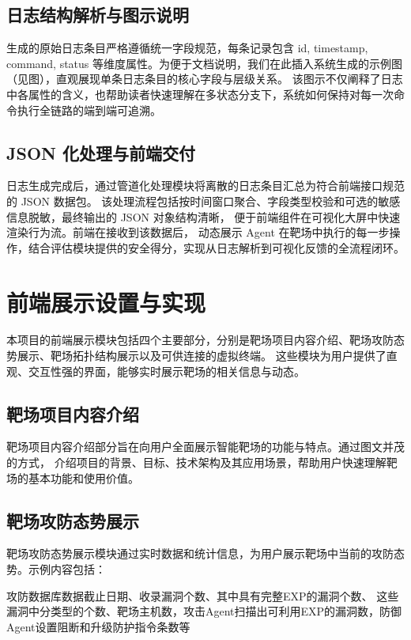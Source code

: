 \documentclass[lang=cn,10pt]{elegantbook}
\begin{document}
\subsection{日志结构解析与图示说明}
生成的原始日志条目严格遵循统一字段规范，每条记录包含 id, timestamp, command, status
等维度属性。为便于文档说明，我们在此插入系统生成的示例图（见图），直观展现单条日志条目的核心字段与层级关系。
该图示不仅阐释了日志中各属性的含义，也帮助读者快速理解在多状态分支下，系统如何保持对每一次命令执行全链路的端到端可追溯。

\subsection{JSON 化处理与前端交付}
日志生成完成后，通过管道化处理模块将离散的日志条目汇总为符合前端接口规范的 JSON 数据包。
该处理流程包括按时间窗口聚合、字段类型校验和可选的敏感信息脱敏，最终输出的 JSON 对象结构清晰，
便于前端组件在可视化大屏中快速渲染行为流。前端在接收到该数据后，
动态展示 Agent 在靶场中执行的每一步操作，结合评估模块提供的安全得分，实现从日志解析到可视化反馈的全流程闭环。


\section{前端展示设置与实现}

本项目的前端展示模块包括四个主要部分，分别是靶场项目内容介绍、靶场攻防态势展示、靶场拓扑结构展示以及可供连接的虚拟终端。
这些模块为用户提供了直观、交互性强的界面，能够实时展示靶场的相关信息与动态。

\subsection{靶场项目内容介绍}

靶场项目内容介绍部分旨在向用户全面展示智能靶场的功能与特点。通过图文并茂的方式，
介绍项目的背景、目标、技术架构及其应用场景，帮助用户快速理解靶场的基本功能和使用价值。

\subsection{靶场攻防态势展示}

靶场攻防态势展示模块通过实时数据和统计信息，为用户展示靶场中当前的攻防态势。示例内容包括：  

攻防数据库数据截止日期、收录漏洞个数、其中具有完整EXP的漏洞个数、  
这些漏洞中分类型的个数、靶场主机数，攻击Agent扫描出可利用EXP的漏洞数，防御Agent设置阻断和升级防护指令条数等
\end{document}
